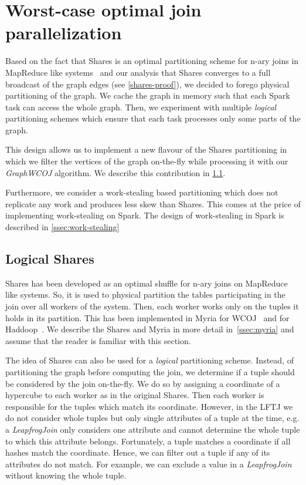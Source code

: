 \section{Worst-case optimal join parallelization}  %

Based on the fact that Shares is an optimal partitioning scheme for n-ary joins in MapReduce like systems~\cite{shares} and
our analysis that Shares converges to a full broadcast of the graph edges (see \cref{shares-proof}), we decided
to forego physical partitioning of the graph.
We cache the graph in memory such that each Spark task can access the whole graph.
Then, we experiment with multiple \textit{logical} partitioning schemes which ensure that each task processes
only some parts of the graph.

This design allows us to implement a new flavour of the Shares partitioning in which we filter the vertices of the
graph on-the-fly while processing it with our \textit{Graph\textsc{WCOJ}} algorithm.
We describe this contribution in \cref{ssec:shares-logical}.

Furthermore, we consider a work-stealing based partitioning which does not replicate any work and produces less
skew than Shares. %
This comes at the price of implementing work-stealing on Spark.
The design of work-stealing in Spark is described in \cref{ssec:work-stealing}

\subsection{Logical Shares} \label{ssec:shares-logical}
Shares has been developed as an optimal shuffle for n-ary joins on MapReduce like systems.
So, it is used to physical partition the tables participating in the join over all workers of the system.
Then, each worker works only on the tuples it holds in its partition.
This has been implemented in Myria for \textsc{WCOJ}~\cite{myria-detailed} and for Haddoop~\cite{TODO}.
We describe the Shares and Myria in more detail in~\cref{ssec:myria} and assume that the reader is familiar
with this section.

The idea of Shares can also be used for a \textit{logical} partitioning scheme.
Instead, of partitioning the graph before computing the join, we determine if a tuple should be considered by the
join on-the-fly.
We do so by assigning a coordinate of a hypercube to each worker as in the original Shares.
Then each worker is responsible for the tuples which match its coordinate.
However, in the \textsc{LFTJ} we do not consider whole tuples but only single attributes of a tuple at the time,
e.g. a \textit{LeapfrogJoin} only considers one attribute and cannot determine the whole tuple to which this attribute
belongs.
Fortunately, a tuple matches a coordinate if all hashes match the coordinate.
Hence, we can filter out a tuple if any of its attributes do not match.
For example, we can exclude a value in a \textit{LeapfrogJoin} without knowing the whole tuple.

